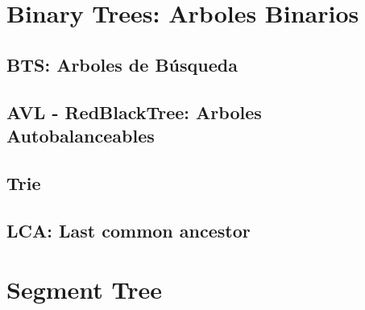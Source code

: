 \documentclass[12pt, fleqn]{report}                             %
\theoremstyle{break}                                            %
\begin{document}
    \clearpage
    \chapter{Binary Trees: Arboles Binarios}

        \section{BTS: Arboles de Búsqueda}

        \section{AVL - RedBlackTree: Arboles Autobalanceables}

        \section{Trie}

        \section{LCA: Last common ancestor}

    
    \clearpage
    \chapter{Segment Tree}
\end{document}
